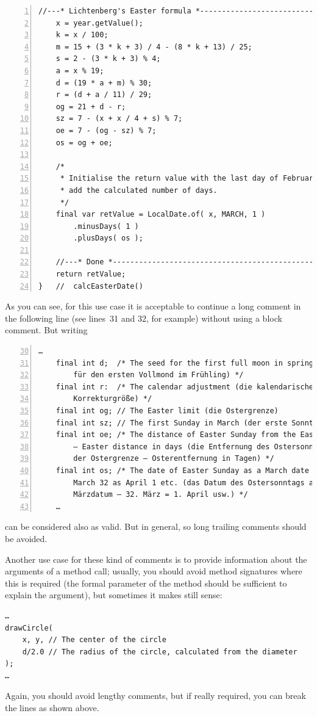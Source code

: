 \documentclass[11pt,a4paper, titlepage, parskip=half, headsepline, footsepline, cleardoublepage=current, headheight=1cm]{scrbook}
\begin{document}
\begin{lstlisting}[numbers=left,caption={Gauss' Easter algorithm\autocite{WIKIPEDIA:DateOfEaster,WIKIPEDIA:Gaussche_Osterformel}},label={listing:GaussEaster}]
    //---* Lichtenberg's Easter formula *----------------------------
    x = year.getValue();
    k = x / 100;    
    m = 15 + (3 * k + 3) / 4 - (8 * k + 13) / 25;
    s = 2 - (3 * k + 3) % 4;
    a = x % 19;
    d = (19 * a + m) % 30;
    r = (d + a / 11) / 29;
    og = 21 + d - r;
    sz = 7 - (x + x / 4 + s) % 7;
    oe = 7 - (og - sz) % 7;
    os = og + oe;

    /*
     * Initialise the return value with the last day of February and 
     * add the calculated number of days.
     */
    final var retValue = LocalDate.of( x, MARCH, 1 )
        .minusDays( 1 )
        .plusDays( os );

    //---* Done *----------------------------------------------------
    return retValue;
}   //  calcEasterDate()
\end{lstlisting}

As you can see, for this use case it is acceptable to continue a long comment in the following line (see lines~31 and 32, for example) without using a block comment. But writing
\begin{lstlisting}[numbers=left,firstnumber=30]
    …
    final int d;  /* The seed for the first full moon in spring (der Keim 
        für den ersten Vollmond im Frühling) */
    final int r:  /* The calendar adjustment (die kalendarische
        Korrekturgröße) */
    final int og; // The Easter limit (die Ostergrenze)
    final int sz; // The first Sunday in March (der erste Sonntag im März)
    final int oe; /* The distance of Easter Sunday from the Easter limit
        – Easter distance in days (die Entfernung des Ostersonntags von 
        der Ostergrenze – Osterentfernung in Tagen) */
    final int os; /* The date of Easter Sunday as a March date with 
        March 32 as April 1 etc. (das Datum des Ostersonntags als 
        Märzdatum – 32. März = 1. April usw.) */
    …    
\end{lstlisting}
can be considered also as valid. But in general, so long trailing comments should be avoided.

Another use case for these kind of comments is to provide information about the arguments of a method call; usually, you should avoid method signatures where this is required (the formal parameter of the method should be sufficient to explain the argument), but sometimes it makes still sense:
\begin{lstlisting}
…
drawCircle(
    x, y, // The center of the circle
    d/2.0 // The radius of the circle, calculated from the diameter
);
…
\end{lstlisting}
Again, you should avoid lengthy comments, but if really required, you can break the lines as shown above.
\end{document}
